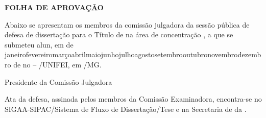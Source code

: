 \makeatletter
\iffinalversion
  \begin{center}
    \large\bfseries\MakeUppercase{Folha de Aprovação}
  \end{center}
  \vspace{2cm}

  \noindent Abaixo se apresentam os membros da comissão julgadora da sessão pública de defesa de dissertação para o Título de \@degnamept\xspace na área de concentração \@areaConcentracao, a que se submeteu \@artigo\xspace alun\@artigo\xspace \if\@autora\relax\@autor\else\@autora\fi, em \@dia\xspace de \ifcase \@mes \or janeiro\or fevereiro\or março\or abril\or maio\or junho\or julho\or agosto\or setembro\or outubro\or novembro\or dezembro\fi\xspace de \@ano\xspace no \@UNIDADEENSINO{} -- \@UNIDADEENSINOABREV/UNIFEI, em \@CIDADE/MG.

  \vfill

  \ifx\@avalA\relax
  \else
    \noindent \textbf{\@avalA} \par
    \noindent Presidente da Comissão Julgadora \par \vspace{2.5em}

    \ifx\@avalB\relax\else
      \noindent \textbf{\@avalB} \par
      \noindent \@instavalB \par \vspace{2.5em}
    \fi
    
    \ifx\@avalC\relax\else
      \noindent \textbf{\@avalC} \par
      \noindent \@instavalC \par \vspace{2.5em}
    \fi
    
    \ifx\@avalD\relax\else
      \noindent \textbf{\@avalD} \par
      \noindent \@instavalD \par \vspace{2.5em}
    \fi
    
    \ifx\@avalE\relax\else
      \noindent \textbf{\@avalE} \par
      \noindent \@instavalE \par \vspace{2.5em}
    \fi
    
    \ifx\@avalF\relax\else
      \noindent \textbf{\@avalF} \par
      \noindent \@instavalF
    \fi
  \fi

  \vfill
  \suppresshyphens
  \noindent
  Ata da defesa, assinada pelos membros da Comissão Examinadora, encontra-se no SIGAA-SIPAC/Sistema de Fluxo de Dissertação/Tese e na Secretaria de \@nivelEnsino\xspace da \@UNIDADEENSINO.
  \vfill
\else
\fi
\makeatother